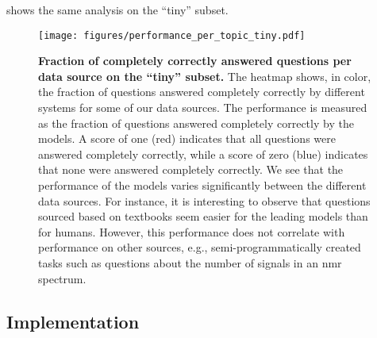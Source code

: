  shows the same analysis on the \enquote{tiny} subset. 


\begin{figure}[htb]
    \centering
    \texttt{[image: figures/performance\_per\_topic\_tiny.pdf]}
    \caption{\textbf{Fraction of completely correctly answered questions per data source on the \enquote{tiny} subset.} The heatmap shows, in color, the fraction of questions answered completely correctly by different systems for some of our data sources. The performance is measured as the fraction of questions answered completely correctly by the models. A score of one (red) indicates that all questions were answered completely correctly, while a score of zero (blue) indicates that none were answered completely correctly.
        We see that the performance of the models varies significantly between the different data sources. For instance, it is interesting to observe that questions sourced based on textbooks seem easier for the leading models than for humans. However, this performance does not correlate with performance on other sources, e.g., semi-programmatically created tasks such as questions about the number of signals in an \gls{nmr} spectrum.
    }
    \label{fig:performance_per_topic_tiny}
\end{figure}





\clearpage

\subsection{Implementation}

